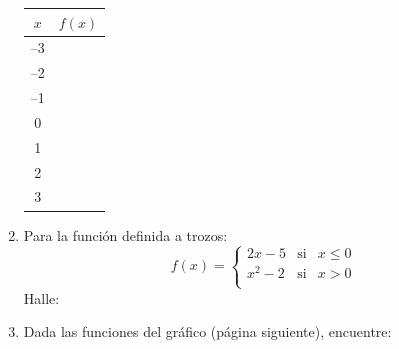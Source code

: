 \documentclass[fleqn]{article}
\begin{document}
\begin{enumerate}
\begin{minipage}{0.5\textwidth}
\begin{tabular}{|c|c|}\hline
$x$ & $f(x)$\\ \hline
--3 & \\ \hline
--2 & \\ \hline
--1 & \\ \hline
0 & \\ \hline
1 & \\ \hline
2 & \\ \hline
3 & \\ \hline
\end{tabular}
\end{minipage}\hfill
\begin{minipage}{0.45\textwidth}
\end{minipage}
\item Para la función definida a trozos:
\[f(x)=\left\{ \begin{array}{lcl}
              2x-5 & \mbox{si} & x\leq0\\
              x^{2}-2 & \mbox{si} & x>0\\
             \end{array}
\right. \]
Halle:
\begin{enumerate}
\end{enumerate}
\item Dada las funciones del gráfico (página siguiente), encuentre:


\end{enumerate}
\end{document}
